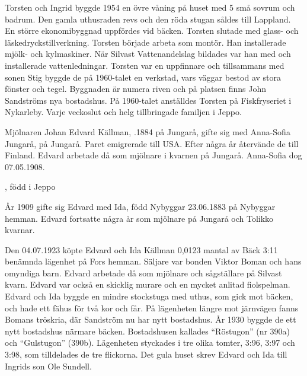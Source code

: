 
Torsten och Ingrid byggde 1954 en övre våning på huset med 5 små sovrum och badrum. Den gamla uthusraden revs och den röda stugan såldes till Lappland. En större ekonomibyggnad uppfördes vid bäcken. Torsten slutade med glass- och läskedryckstillverkning. Torsten började arbeta som montör. Han installerade mjölk- och kylmaskiner. När Silvast	Vattenandelslag bildades var han med och installerade vattenledningar. Torsten var en uppfinnare och tillsammans med sonen Stig byggde de på 1960-talet en verkstad, vars väggar bestod av stora fönster och tegel. 	Byggnaden är numera riven och på platsen finns John Sandströms nya 	bostadshus. På 1960-talet anställdes Torsten på Fiskfryseriet i Nykarleby. Varje veckoslut och helg tillbringade familjen i Jeppo.


Mjölnaren Johan Edvard Källman, .1884 på Jungarå, gifte sig med Anna-Sofia Jungarå,  på Jungarå. Paret 	emigrerade till USA. Efter några år återvände de till Finland. Edvard arbetade då som mjölnare i kvarnen på Jungarå. Anna-Sofia dog 07.05.1908.
\begin{jhchildren}
  \item {}
  \item {}
  \item {}, född i Jeppo
\end{jhchildren}

År 1909 gifte sig Edvard med Ida, född Nybyggar 23.06.1883 på Nybyggar hemman. Edvard fortsatte några år som mjölnare på Jungarå och Tolikko kvarnar.
\begin{jhchildren}
  \item {}
  \item {}
\end{jhchildren}

Den 04.07.1923 köpte Edvard och Ida Källman 0,0123 mantal av Bäck 3:11 benämnda lägenhet på Fors hemman. Säljare var bonden Viktor Boman och hans omyndiga barn. Edvard arbetade då som mjölnare och sågställare på Silvast kvarn. Edvard var också en skicklig murare och en mycket anlitad fiolspelman. Edvard och Ida byggde en mindre stockstuga	med uthus, som gick mot bäcken, och hade ett fähus för två kor och får. På lägenheten längre mot järnvägen fanns Bomans tröskria, där 	Sandström nu har nytt bostadshus. År 1930 byggde de ett nytt bostadshus närmare bäcken. Bostadshusen kallades ``Röstugon'' (nr 390a) och 	``Gulstugon'' (390b). Lägenheten styckades i tre olika tomter, 3:96, 3:97 och 	3:98, som tilldelades de tre flickorna. Det gula huset skrev Edvard och Ida till Ingrids son Ole Sundell.

